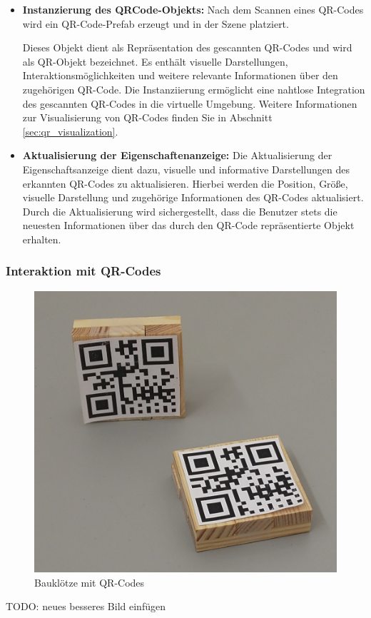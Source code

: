 \begin{itemize}
\item \textbf{Instanzierung des QRCode-Objekts:}
Nach dem Scannen eines QR-Codes wird ein QR-Code-Prefab erzeugt und in der Szene platziert.

Dieses Objekt dient als Repräsentation des gescannten QR-Codes und wird als QR-Objekt bezeichnet. Es enthält visuelle
Darstellungen, Interaktionsmöglichkeiten und weitere relevante Informationen über den zugehörigen QR-Code. Die Instanziierung
ermöglicht eine nahtlose Integration des gescannten QR-Codes in die virtuelle Umgebung. Weitere Informationen zur Visualisierung
von QR-Codes finden Sie in Abschnitt \ref{sec:qr_visualization}.

\item \textbf{Aktualisierung der Eigenschaftenanzeige:}
Die Aktualisierung der Eigenschaftsanzeige dient dazu, visuelle und informative Darstellungen des erkannten QR-Codes zu
aktualisieren. Hierbei werden die Position, Größe, visuelle Darstellung und zugehörige Informationen des QR-Codes aktualisiert.
Durch die Aktualisierung wird sichergestellt, dass die Benutzer stets die neuesten Informationen über das durch den QR-Code
repräsentierte Objekt erhalten.

\end{itemize}

\subsubsection{Interaktion mit QR-Codes}
\begin{figure}[H]
\centering
\includegraphics[scale=0.04, angle=0]{images/bauklotz}
\caption{Bauklötze mit QR-Codes}
\label{fig:bauklotz}
\end{figure}
TODO: neues besseres Bild einfügen

